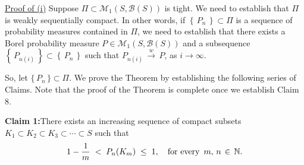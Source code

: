 \renewcommand{\theenumi}{\alph{enumi}}
\renewcommand{\labelenumi}{\textnormal{(\theenumi)}$\;\;$}

\vskip 0.3cm
\noindent
\underline{Proof of (i)}
\vskip 0.2cm
\noindent
Suppose $\Pi \subset \mathcal{M}_{1}(S,\mathcal{B}(S))$ is tight.
We need to establish that $\Pi$ is weakly sequentially compact.
In other words, if $\left\{\,P_{n}\,\right\} \subset \Pi$ is a sequence of probability measures contained in $\Pi$,
we need to establish that there exists a Borel probability measure
$P \in \mathcal{M}_{1}(S,\mathcal{B}(S))$ and a subsequence
$\left\{\,P_{n(i)}\,\right\} \subset \left\{\,P_{n}\,\right\}$
such that $P_{n(i)}\,\overset{w}{\longrightarrow}\,P$, as $i \longrightarrow \infty$.

\vskip 0.5cm
\noindent
So, let $\{\,P_{n}\,\} \subset \Pi$.
We prove the Theorem by establishing the following series of Claims.
Note that the proof of the Theorem is complete once we establish Claim 8.

\vskip 0.5cm
\begin{center}
\begin{minipage}{6.5in}
\textbf{Claim 1:}\quad There exists an increasing sequence of compact subsets
$K_{1} \subset K_{2} \subset K_{3} \subset \cdots \subset S$ such that
\begin{equation*}
1 - \dfrac{1}{m} \; < \; P_{n}(K_{m}) \; \leq \; 1,
\quad
\textnormal{for every \,$m, \,n \,\in\, \mathbb{N}$}.
\end{equation*}
\end{minipage}
\end{center}

